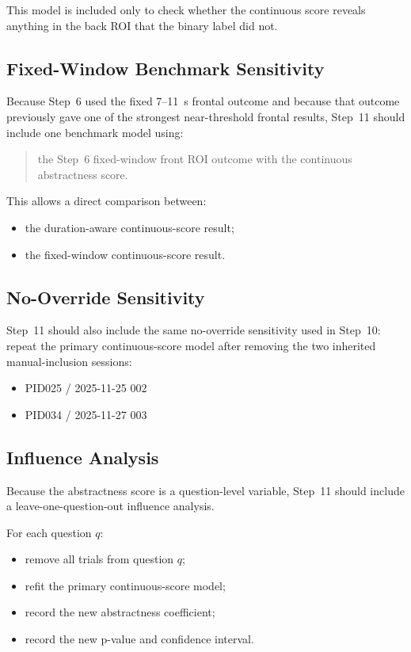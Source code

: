 This model is included only to check whether the continuous score reveals anything in the back ROI
that the binary label did not.

\subsection{Fixed-Window Benchmark Sensitivity}
Because Step~6 used the fixed 7--11~s frontal outcome and because that outcome previously gave one of
the strongest near-threshold frontal results, Step~11 should include one benchmark model using:
\begin{quote}
the Step~6 fixed-window front ROI outcome with the continuous abstractness score.
\end{quote}

This allows a direct comparison between:
\begin{itemize}
    \item the duration-aware continuous-score result;
    \item the fixed-window continuous-score result.
\end{itemize}

\subsection{No-Override Sensitivity}
Step~11 should also include the same no-override sensitivity used in Step~10:
repeat the primary continuous-score model after removing the two inherited manual-inclusion sessions:
\begin{itemize}
    \item PID025 / 2025-11-25 002
    \item PID034 / 2025-11-27 003
\end{itemize}

\subsection{Influence Analysis}
Because the abstractness score is a question-level variable, Step~11 should include a
leave-one-question-out influence analysis.

For each question \(q\):
\begin{itemize}
    \item remove all trials from question \(q\);
    \item refit the primary continuous-score model;
    \item record the new abstractness coefficient;
    \item record the new p-value and confidence interval.
\end{itemize}


